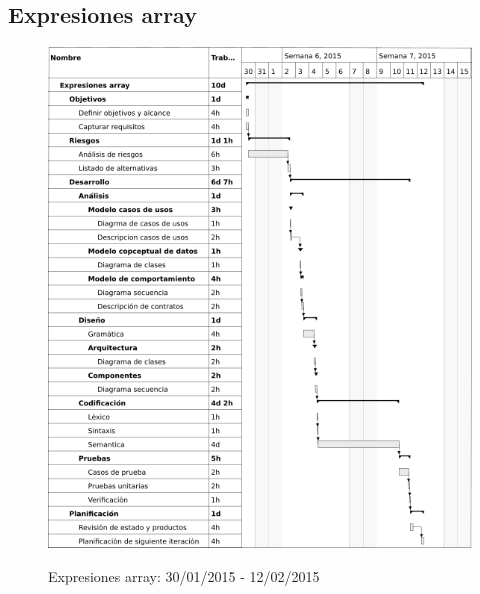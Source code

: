 \subsection{Expresiones array}
\begin{center}
\begin{figure}[H]
\centering
\includegraphics[scale=1]{planning/12-expresiones-array.png} \\
\caption{Expresiones array: 30/01/2015 - 12/02/2015 }
\end{figure}
\end{center}

